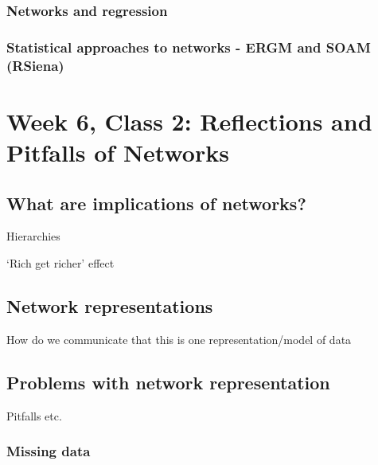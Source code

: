 \documentclass[
]{book}
\begin{document}
\hypertarget{networks-and-regression}{%
\subsection{Networks and regression}\label{networks-and-regression}}

\hypertarget{statistical-approaches-to-networks---ergm-and-soam-rsiena}{%
\subsection{Statistical approaches to networks - ERGM and SOAM (RSiena)}\label{statistical-approaches-to-networks---ergm-and-soam-rsiena}}

\hypertarget{week-6-class-2-reflections-and-pitfalls-of-networks}{%
\chapter{Week 6, Class 2: Reflections and Pitfalls of Networks}\label{week-6-class-2-reflections-and-pitfalls-of-networks}}

\hypertarget{what-are-implications-of-networks}{%
\section{What are implications of networks?}\label{what-are-implications-of-networks}}

Hierarchies

`Rich get richer' effect

\hypertarget{network-representations}{%
\section{Network representations}\label{network-representations}}

How do we communicate that this is one representation/model of data

\hypertarget{problems-with-network-representation}{%
\section{Problems with network representation}\label{problems-with-network-representation}}

Pitfalls etc.

\hypertarget{missing-data-1}{%
\subsection{Missing data}\label{missing-data-1}}
\end{document}
